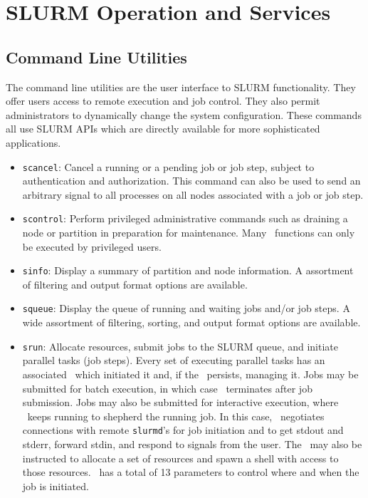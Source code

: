 \section{SLURM Operation and Services}
\subsection{Command Line Utilities}

The command line utilities are the user interface to SLURM functionality.
They offer users access to remote execution and job control. They also
permit administrators to dynamically change the system configuration.
These commands all use SLURM APIs which are directly available for
more sophisticated applications.

\begin{itemize}
\item {\tt scancel}: Cancel a running or a pending job or job step,
subject to authentication and authorization. This command can also
be used to send an arbitrary signal to all processes on all nodes
associated with a job or job step.

\item {\tt scontrol}: Perform privileged administrative commands
such as draining a node or partition in preparation for maintenance.
Many \scontrol\ functions can only be executed by privileged users.

\item {\tt sinfo}: Display a summary of partition and node information.
A assortment of filtering and output format options are available.

\item {\tt squeue}: Display the queue of running and waiting jobs
and/or job steps. A wide assortment of filtering, sorting, and output
format options are available.

\item {\tt srun}: Allocate resources, submit jobs to the SLURM queue,
and initiate parallel tasks (job steps).
Every set of executing parallel tasks has an associated \srun\ which
initiated it and, if the \srun\ persists, managing it.
Jobs may be submitted for batch execution, in which case
\srun\ terminates after job submission.
Jobs may also be submitted for interactive execution, where \srun\ keeps
running to shepherd the running job. In this case,
\srun\ negotiates connections with remote {\tt slurmd}'s
for job initiation and to
get stdout and stderr, forward stdin, and respond to signals from the user.
The \srun\ may also be instructed to allocate a set of resources and
spawn a shell with access to those resources.
\srun\ has a total of 13 parameters to control where and when the job
is initiated.

\end{itemize}

